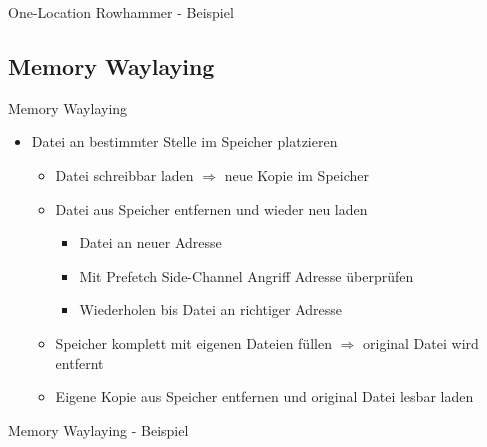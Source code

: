 \documentclass[german,10pt,xcolor=colortbl,compress
]{beamer}
\begin{document}
\begin{frame}{One-Location Rowhammer - Beispiel}
\only<1>{\texttt{load} }
\only<2>{\texttt{flush} }
\end{frame}

\subsection{Memory Waylaying}
\begin{frame}{Memory Waylaying}
\begin{itemize}
	\item Datei an bestimmter Stelle im Speicher platzieren
	\begin{itemize}
		\item Datei schreibbar laden $ \Rightarrow $ neue Kopie im Speicher
		\item Datei aus Speicher entfernen und wieder neu laden
		\begin{itemize}
			\item Datei an neuer Adresse
			\item Mit Prefetch Side-Channel Angriff Adresse überprüfen
			\item Wiederholen bis Datei an richtiger Adresse
		\end{itemize}
		\item Speicher komplett mit eigenen Dateien füllen $ \Rightarrow $ original Datei wird entfernt
		\item Eigene Kopie aus Speicher entfernen und original Datei lesbar laden
	\end{itemize}
\end{itemize}
\end{frame}

\begin{frame}{Memory Waylaying - Beispiel}
\only<2>{Datei neu laden }
\end{frame}
\end{document}
